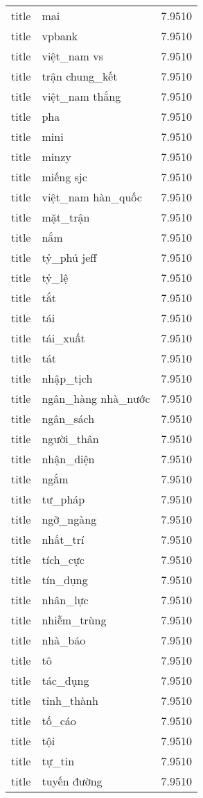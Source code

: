 \documentclass{article}
\begin{document}
\begin{tabular}{lll}
title & mai & 7.9510\\
title & vpbank & 7.9510\\
title & việt\_nam vs & 7.9510\\
title & trận chung\_kết & 7.9510\\
title & việt\_nam thắng & 7.9510\\
title & pha & 7.9510\\
title & mini & 7.9510\\
title & minzy & 7.9510\\
title & miếng sjc & 7.9510\\
title & việt\_nam hàn\_quốc & 7.9510\\
title & mặt\_trận & 7.9510\\
title & nắm & 7.9510\\
title & tỷ\_phú jeff & 7.9510\\
title & tỷ\_lệ & 7.9510\\
title & tắt & 7.9510\\
title & tái & 7.9510\\
title & tái\_xuất & 7.9510\\
title & tát & 7.9510\\
title & nhập\_tịch & 7.9510\\
title & ngân\_hàng nhà\_nước & 7.9510\\
title & ngân\_sách & 7.9510\\
title & người\_thân & 7.9510\\
title & nhận\_diện & 7.9510\\
title & ngắm & 7.9510\\
title & tư\_pháp & 7.9510\\
title & ngỡ\_ngàng & 7.9510\\
title & nhất\_trí & 7.9510\\
title & tích\_cực & 7.9510\\
title & tín\_dụng & 7.9510\\
title & nhân\_lực & 7.9510\\
title & nhiễm\_trùng & 7.9510\\
title & nhà\_báo & 7.9510\\
title & tô & 7.9510\\
title & tác\_dụng & 7.9510\\
title & tỉnh\_thành & 7.9510\\
title & tố\_cáo & 7.9510\\
title & tội & 7.9510\\
title & tự\_tin & 7.9510\\
title & tuyến đường & 7.9510\\

\end{tabular}
\end{document}
